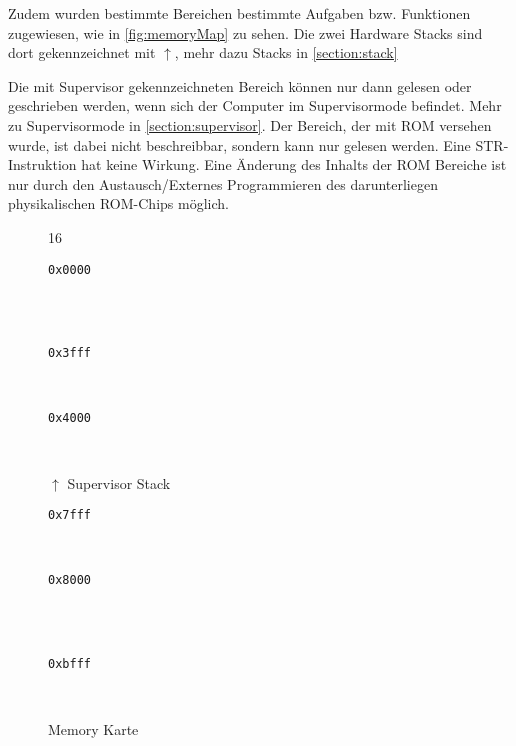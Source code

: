 \documentclass{scrartcl}
\begin{document}
Zudem wurden bestimmte Bereichen bestimmte Aufgaben bzw. Funktionen zugewiesen, wie in \autoref{fig:memoryMap} zu sehen.
Die zwei Hardware Stacks sind dort gekennzeichnet mit $\uparrow$, mehr dazu Stacks in \autoref{section:stack}

Die mit Supervisor gekennzeichneten Bereich können nur dann gelesen oder geschrieben werden, wenn sich der Computer im Supervisormode befindet.
Mehr zu Supervisormode in \autoref{section:supervisor}.
Der Bereich, der mit ROM versehen wurde, ist dabei nicht beschreibbar, sondern kann nur gelesen werden.
Eine STR-Instruktion hat keine Wirkung.
Eine Änderung des Inhalts der ROM Bereiche ist nur durch den Austausch/Externes Programmieren des darunterliegen physikalischen ROM-Chips möglich.

\begin{figure}[h]
	\centering
	\caption{Memory Karte}
	\label{fig:memoryMap}
	\begin{bytefield}[leftcurly=., rightcurly=., leftcurlyspace=0pt, rightcurlyspace=0pt]{16}
		
		\begin{leftwordgroup}{\small \texttt{0x0000}}
		\end{leftwordgroup}\\
		 \\
		\begin{leftwordgroup}{\small \texttt{0x3fff}}
		\end{leftwordgroup}\\

		\begin{leftwordgroup}{\small \texttt{0x4000}}
		\end{leftwordgroup}\\
		\begin{rightwordgroup}{\large $\uparrow$ Supervisor Stack}
			 \\
		\end{rightwordgroup}
		\begin{leftwordgroup}{\small \texttt{0x7fff}}
		\end{leftwordgroup}\\

		\begin{leftwordgroup}{\small \texttt{0x8000}}
		\end{leftwordgroup}\\
			 \\
		\begin{leftwordgroup}{\small \texttt{0xbfff}}
		\end{leftwordgroup}\\


\end{bytefield}
\end{figure}
\end{document}
